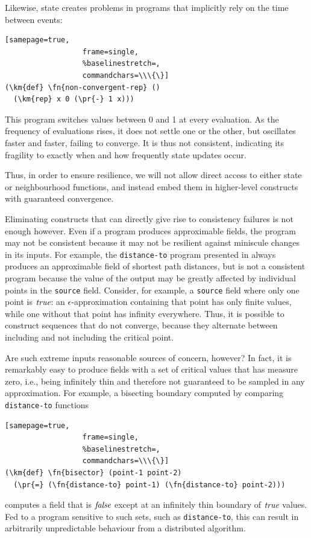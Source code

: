 \documentclass[12pt,a4paper,twoside,openright]{book}
\begin{document}
Likewise, state creates problems in programs that implicitly rely on the time between events:
\begin{samepage}
\begin{Verbatim}[samepage=true,
                  frame=single,
                  %baselinestretch=,
                  commandchars=\\\{\}]
(\km{def} \fn{non-convergent-rep} ()
  (\km{rep} x 0 (\pr{-} 1 x)))
\end{Verbatim}
\end{samepage}
%
This program switches values between 0 and 1 at every evaluation.
%
As the frequency of evaluations rises, it does not settle one or the other, but oscillates faster and faster, failing to converge.
%
It is thus not consistent, indicating its fragility to exactly when and how frequently state updates occur.

Thus, in order to ensure resilience, we will not allow direct access to either state or neighbourhood functions, and instead embed them in higher-level constructs with guaranteed convergence.

Eliminating constructs that can directly give rise to consistency failures is not enough however.
%
Even if a program produces approximable fields, the program may not be consistent because it may not be resilient against miniscule changes in its inputs.
%
For example, the {\tt distance-to} program presented in  always produces an approximable field of shortest path distances, but is not a consistent program because
the value of the output may be greatly affected by individual points in the {\tt source} field.
%
Consider, for example, a {\tt source} field where only one point is $\textit{true}$: an $\epsilon$-approximation containing that point has only finite values, while one without that
point has infinity everywhere.
%
Thus, it is possible to construct sequences that do not converge, because they alternate between including and not including the critical point.

Are such extreme inputs reasonable sources of concern, however?
%
In fact, it is remarkably easy to produce fields with a set of critical values that has measure zero, i.e., being infinitely thin and therefore not guaranteed to be sampled in any approximation.
%
For example, a bisecting boundary computed by comparing {\tt distance-to} functions
\begin{samepage}
\begin{Verbatim}[samepage=true,
                  frame=single,
                  %baselinestretch=,
                  commandchars=\\\{\}]
(\km{def} \fn{bisector} (point-1 point-2)
  (\pr{=} (\fn{distance-to} point-1) (\fn{distance-to} point-2)))
\end{Verbatim}
\end{samepage}
computes a field that is $\textit{false}$ except at an infinitely thin boundary of $\textit{true}$ values.  Fed to a program sensitive to such sets, such as {\tt distance-to}, this can result in arbitrarily unpredictable behaviour from a distributed algorithm.
\end{document}
